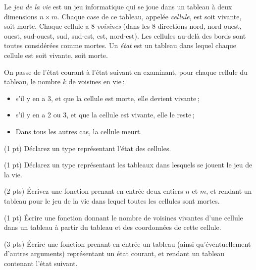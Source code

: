 



Le \emph{jeu de la vie} est un jeu informatique qui se joue dans un
tableau {\`a} deux dimensions $n\times m$. Chaque case de ce tableau,
appel{\'e}e \emph{cellule}, est soit vivante, soit morte. Chaque cellule a
8 \emph{voisines} (dans les 8 directions nord, nord-ouest, ouest,
sud-ouest, sud, sud-est, est, nord-est). Les cellules au-del{\`a} des
bords sont toutes consid{\'e}r{\'e}es comme mortes. Un \emph{{\'e}tat} est un
tableau dans lequel chaque cellule est soit vivante, soit morte.

On passe de l'{\'e}tat courant {\`a} l'{\'e}tat suivant en examinant, pour
chaque cellule du tableau, le nombre $k$ de voisines en
vie\,:
\begin{itemize}
\item s'il y en a 3, et que la cellule est morte, elle devient vivante\,;
\item s'il y en a 2 ou 3, et que la cellule est vivante, elle le reste\,;
\item Dans tous les autres cas, la cellule meurt.
\end{itemize}


\question (1 pt) D{\'e}clarez un type repr{\'e}sentant l'{\'e}tat des
cellules.

\question (1 pt) D{\'e}clarez un type repr{\'e}sentant les tableaux dans
lesquels se jouent le jeu de la vie.

\question (2 pts) {\'E}crivez une fonction prenant en entr{\'e}e deux entiers $n$
et $m$, et rendant un tableau pour le jeu de la vie dans lequel toutes
les cellules sont mortes.

\question (1 pt) {\'E}crire une fonction donnant le nombre de voisines
vivantes d'une cellule dans un tableau à partir du tableau et des coordonnées
de cette cellule.


\question (3 pts) {\'E}crire une fonction prenant en entr{\'e}e un tableau
(ainsi qu'{\'e}ventuellement d'autres arguments) repr{\'e}sentant un {\'e}tat
courant, et rendant un tableau contenant l'{\'e}tat suivant.

